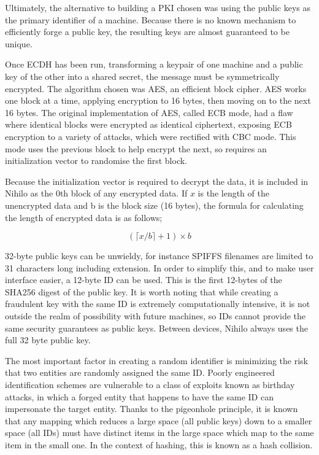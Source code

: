 \documentclass{article}
\begin{document}
Ultimately, the alternative to building a PKI chosen was using the public keys as the primary identifier of a machine. Because there is no known mechanism to efficiently forge a public key, the resulting keys are almost guaranteed to be unique.

Once ECDH has been run, transforming a keypair of one machine and a public key of the other into a shared secret, the message must be symmetrically encrypted. The algorithm chosen was AES\cite{aes}, an efficient block cipher. AES works one block at a time, applying encryption to 16 bytes, then moving on to the next 16 bytes. The original implementation of AES, called ECB mode, had a flaw where identical blocks were encrypted as identical ciphertext, exposing ECB encryption to a variety of attacks, which were rectified with CBC mode. This mode uses the previous block to help encrypt the next, so requires an initialization vector to randomise the first block.

Because the initialization vector is required to decrypt the data, it is included in Nihilo as the 0th block of any encrypted data. If \(x\) is the length of the unencrypted data and b is the block size (16 bytes), the formula for calculating the length of encrypted data is as follows;

\[ ( \lceil x/b \rceil +1) \times b\]

32-byte public keys can be unwieldy, for instance SPIFFS filenames are limited to 31 characters long including extension. In order to simplify this, and to make user interface easier, a 12-byte ID can be used. This is the first 12-bytes of the SHA256 digest of the public key. It is worth noting that while creating a fraudulent key with the same ID is extremely computationally intensive, it is not outside the realm of possibility with future machines, so IDs cannot provide the same security guarantees as public keys. Between devices, Nihilo always uses the full 32 byte public key.

The most important factor in creating a random identifier is minimizing the risk that two entities are randomly assigned the same ID. Poorly engineered identification schemes are vulnerable to a class of exploits known as birthday attacks, in which a forged entity that happens to have the same ID can impersonate the target entity. Thanks to the pigeonhole principle\cite{pigeon}, it is known that any mapping which reduces a large space (all public keys) down to a smaller space (all IDs) must have distinct items in the large space which map to the same item in the small one. In the context of hashing, this is known as a hash collision.
\end{document}
